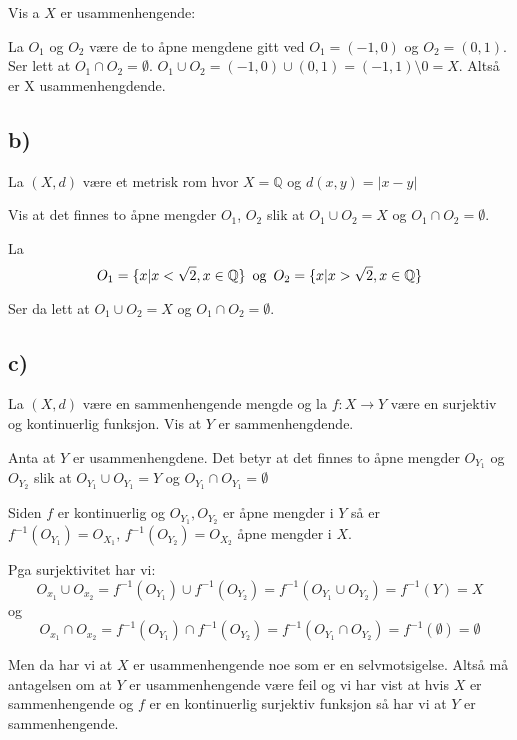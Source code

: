 \documentclass{article}
\begin{document}
                    Vis a $X$ er usammenhengende:

                    La $O_1$ og $O_2$ være de to åpne mengdene gitt ved $O_1 = (-1,0)$ og $O_2 = (0, 1)$. Ser lett at $O_1 \cap O_2 = \emptyset$. $O_1 \cup O_2 = (-1,0) \cup (0,1) = (-1, 1)\setminus{0} = X$. Altså er X usammenhengdende.



                    \subsection*{b)}
                    La $(X, d)$ være et metrisk rom hvor $X = \mathbb{Q}$ og $d(x,y) = |x-y|$

                    Vis at det finnes to åpne mengder $O_1$, $O_2$ slik at $O_1 \cup O_2 = X$ og $O_1 \cap O_2 = \emptyset$.

                    La \[O_1 = \{x | x < \sqrt{2}, x \in \mathbb{Q} \} \text{\, og \,} O_2 = \{x |  x > \sqrt{2}, x \in \mathbb{Q}\}\]

                    Ser da lett at $O_1 \cup O_2 = X$ og $O_1 \cap O_2 = \emptyset$.



                    \subsection*{c)}

                    La $(X, d)$ være en sammenhengende mengde og la $f: X \rightarrow Y$ være en surjektiv og kontinuerlig funksjon. Vis at $Y$ er sammenhengdende.

                    Anta at $Y$ er usammenhengdene. Det betyr at det finnes to åpne mengder $O_{Y_1}$ og $O_{Y_2}$ slik at $O_{Y_1} \cup O_{Y_1} = Y $ og $O_{Y_1} \cap O_{Y_1} = \emptyset$

                    Siden $f$ er kontinuerlig og $O_{Y_1}, O_{Y_2}$ er åpne mengder i $Y$ så er $f^{-1}(O_{Y_1}) = O_{X_1}, \, f^{-1}(O_{Y_2}) = O_{X_2}$ åpne mengder i $X$.

                    Pga surjektivitet har vi:
                    \[O_{x_1} \cup O_{x_2} = f^{-1}(O_{Y_1})  \cup f^{-1}(O_{Y_2})=  f^{-1}(O_{Y_1} \cup O_{Y_2}) = f^{-1}(Y) = X \]
                    og
                    \[O_{x_1} \cap O_{x_2} = f^{-1}(O_{Y_1})  \cap f^{-1}(O_{Y_2})=  f^{-1}(O_{Y_1} \cap O_{Y_2}) = f^{-1}(\emptyset) = \emptyset\]

                    Men da har vi at $X$ er usammenhengende noe som er en selvmotsigelse. Altså må antagelsen om at $Y$ er usammenhengende være feil og vi har vist at hvis $X$ er sammenhengende og $f$ er en kontinuerlig surjektiv funksjon så har vi at $Y$ er sammenhengende.
\end{document}
